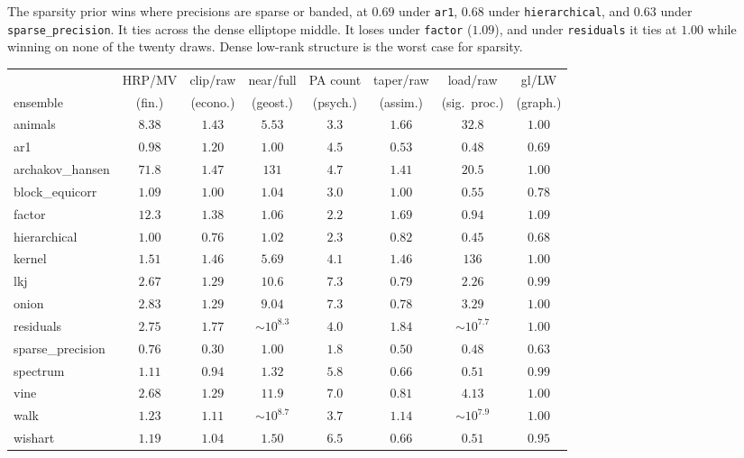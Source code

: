 \documentclass[11pt]{article}
\begin{document}
The sparsity prior wins where precisions are sparse or banded, at $0.69$
under \texttt{ar1}, $0.68$ under \texttt{hierarchical}, and $0.63$ under
\texttt{sparse\_precision}. It ties across the dense elliptope middle. It loses
under \texttt{factor} ($1.09$), and under \texttt{residuals} it ties at
$1.00$ while winning on none of the twenty draws. Dense low-rank structure
is the worst case for sparsity.

\begin{table}[t]
\centering\footnotesize
\setlength{\tabcolsep}{4.5pt}
\begin{tabular}{lccccccc}
\toprule
 & HRP/MV & clip/raw & near/full & PA count & taper/raw & load/raw & gl/LW \\
ensemble & (fin.) & (econo.) & (geost.) & (psych.) & (assim.) & (sig.\
proc.) & (graph.) \\
\midrule
animals & $8.38$ & $1.43$ & $5.53$ & $3.3$ & $1.66$ & $32.8$ & $1.00$ \\
ar1 & $0.98$ & $1.20$ & $1.00$ & $4.5$ & $0.53$ & $0.48$ & $0.69$ \\
archakov\_hansen & $71.8$ & $1.47$ & $131$ & $4.7$ & $1.41$ & $20.5$ & $1.00$ \\
block\_equicorr & $1.09$ & $1.00$ & $1.04$ & $3.0$ & $1.00$ & $0.55$ & $0.78$ \\
factor & $12.3$ & $1.38$ & $1.06$ & $2.2$ & $1.69$ & $0.94$ & $1.09$ \\
hierarchical & $1.00$ & $0.76$ & $1.02$ & $2.3$ & $0.82$ & $0.45$ & $0.68$ \\
kernel & $1.51$ & $1.46$ & $5.69$ & $4.1$ & $1.46$ & $136$ & $1.00$ \\
lkj & $2.67$ & $1.29$ & $10.6$ & $7.3$ & $0.79$ & $2.26$ & $0.99$ \\
onion & $2.83$ & $1.29$ & $9.04$ & $7.3$ & $0.78$ & $3.29$ & $1.00$ \\
residuals & $2.75$ & $1.77$ & $\sim\!10^{8.3}$ & $4.0$ & $1.84$ & $\sim\!10^{7.7}$ & $1.00$ \\
sparse\_precision & $0.76$ & $0.30$ & $1.00$ & $1.8$ & $0.50$ & $0.48$ & $0.63$ \\
spectrum & $1.11$ & $0.94$ & $1.32$ & $5.8$ & $0.66$ & $0.51$ & $0.99$ \\
vine & $2.68$ & $1.29$ & $11.9$ & $7.0$ & $0.81$ & $4.13$ & $1.00$ \\
walk & $1.23$ & $1.11$ & $\sim\!10^{8.7}$ & $3.7$ & $1.14$ & $\sim\!10^{7.9}$ & $1.00$ \\
wishart & $1.19$ & $1.04$ & $1.50$ & $6.5$ & $0.66$ & $0.51$ & $0.95$ \\

\end{tabular}
\end{table}
\end{document}

